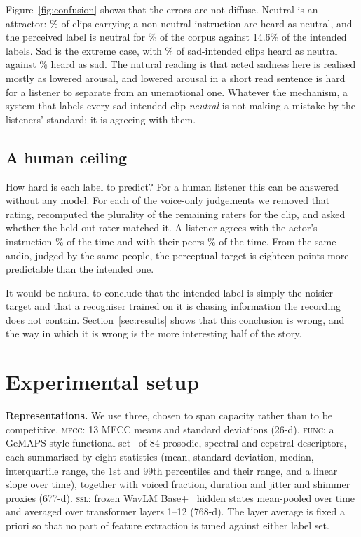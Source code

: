 \documentclass{article}
\begin{document}
Figure~\ref{fig:confusion} shows that the errors are not diffuse. Neutral is an
attractor: \NonNeutralAsNeutral\% of clips carrying a non-neutral instruction
are heard as neutral, and the perceived label is neutral for \NeutralShare\% of
the corpus against 14.6\% of the intended labels. Sad is the extreme case, with
\SadToNeutral\% of sad-intended clips heard as neutral against \SadRecovery\%
heard as sad. The natural reading is that acted sadness here is realised mostly
as lowered arousal, and lowered arousal in a short read sentence is hard for a
listener to separate from an unemotional one. Whatever the mechanism, a system
that labels every sad-intended clip \emph{neutral} is not making a mistake by
the listeners' standard; it is agreeing with them.

\subsection{A human ceiling}

How hard is each label to predict? For a human listener this can be answered
without any model. For each of the \NRatings{} voice-only judgements we removed
that rating, recomputed the plurality of the remaining raters for the clip, and
asked whether the held-out rater matched it. A listener agrees with the actor's
instruction \RaterVsIntended\% of the time and with their peers \RaterVsPeer\%
of the time. From the same audio, judged by the same people, the perceptual
target is eighteen points more predictable than the intended one.

It would be natural to conclude that the intended label is simply the noisier
target and that a recogniser trained on it is chasing information the recording
does not contain. Section~\ref{sec:results} shows that this conclusion is wrong,
and the way in which it is wrong is the more interesting half of the story.

\section{Experimental setup}
\label{sec:setup}

\textbf{Representations.} We use three, chosen to span capacity rather than to
be competitive. \textsc{mfcc}: 13 MFCC means and standard deviations (26-d).
\textsc{func}: a GeMAPS-style functional set~\cite{eyben2016gemaps} of 84
prosodic, spectral and cepstral descriptors, each summarised by eight
statistics (mean, standard deviation, median, interquartile range, the 1st and
99th percentiles and their range, and a linear slope over time), together with
voiced fraction, duration and jitter and shimmer proxies (677-d).
\textsc{ssl}: frozen WavLM Base+~\cite{chen2022wavlm} hidden states mean-pooled
over time and averaged over transformer layers 1--12 (768-d). The layer average
is fixed a priori so that no part of feature extraction is tuned against either
label set.
\end{document}
